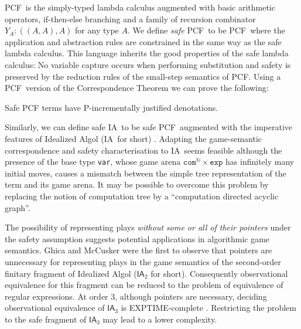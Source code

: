 \documentclass{llncs}
\newcommand\nat{\mathbb{N}}
\newcommand\ialgol{\textsf{IA}}
\newcommand\iacom{\texttt{com}}
\newcommand\iaexp{\texttt{exp}}
\newcommand\iavar{\texttt{var}}
\newcommand\pcf{\textsf{PCF}}
\begin{document}
\pcf\ is the simply-typed lambda calculus augmented with basic
arithmetic operators, if-then-else branching and a family of recursion
combinator $Y_A : ((A,A),A)$ for any type $A$.  We define \emph{safe}
\pcf\ to be \pcf\ where the application and abstraction rules are
constrained in the same way as the safe lambda calculus.  This
language inherits the good properties of the safe lambda calculus: No
variable capture occurs when performing substitution and safety is
preserved by the reduction rules of the small-step semantics of
\pcf. Using a \pcf\ version of the Correspondence Theorem we can prove
the following:
\begin{theorem}
\label{thm:safepcfpincr}
Safe PCF terms have P-incrementally justified denotations.
\end{theorem}

Similarly, we can define safe \ialgol\ to be safe \pcf\ augmented with
the imperative features of Idealized Algol (\ialgol\ for short)
\cite{Reynolds81}.  Adapting the game-semantic correspondence and
safety characterisation to \ialgol\ seems feasible although the
presence of the base type \iavar, whose game arena $\iacom^{\nat}
\times \iaexp$ has infinitely many initial moves, causes a mismatch
between the simple tree representation of the term and its game
arena. It may be possible to overcome this problem by replacing the
notion of computation tree by a ``computation directed acyclic
graph''.

The possibility of representing plays \emph{without some or all of
  their pointers} under the safety assumption suggests potential
applications in algorithmic game semantics. Ghica and McCusker
\cite{ghicamccusker00} were the first to observe that pointers are
unnecessary for representing plays in the game semantics of the
second-order finitary fragment of Idealized Algol ($\ialgol_2$ for
short). Consequently observational equivalence for this fragment can
be reduced to the problem of equivalence of regular expressions.  At
order $3$, although pointers are necessary, deciding observational
equivalence of $\ialgol_3$ is EXPTIME-complete
\cite{DBLP:journals/apal/Ong04,DBLP:conf/fossacs/MurawskiW05}. Restricting
the problem to the safe fragment of $\ialgol_3$ may lead to a lower
complexity.


\end{document}
